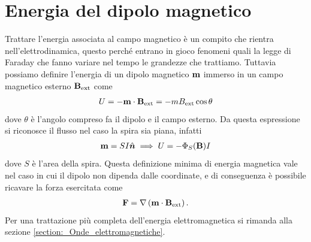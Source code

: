 \section{Energia del dipolo magnetico}
Trattare l'energia associata al campo magnetico è un compito che rientra nell'elettrodinamica, questo perché entrano in gioco fenomeni quali la legge 
di Faraday che fanno variare nel tempo le grandezze che trattiamo. Tuttavia possiamo definire l'energia di un dipolo magnetico $ \mathbf{ m } $ immerso 
in un campo magnetico esterno $ \mathbf{ B }_{\text{ext}} $ come
\begin{align}
  U = - \mathbf{ m } \cdot \mathbf{ B }_{\text{ext}} = - m { B }_{\text{ext}} \cos\theta
\end{align}
dove $ \theta $ è l'angolo compreso fa il dipolo e il campo esterno. Da questa espressione si riconosce il flusso nel caso la spira sia piana, infatti
\begin{align}
  \mathbf{ m } = S I \hat{\boldsymbol{n}} \implies U = - \Phi_S({\mathbf{ B }}) I
\end{align}
dove $ S $ è l'area della spira. Questa definizione minima di energia magnetica vale nel caso in cui il dipolo non 
dipenda dalle coordinate, e di conseguenza è possibile ricavare la forza esercitata come
\begin{align}
  \mathbf{ F } = \nabla\left( \mathbf{ m } \cdot \mathbf{ B }_{\text{ext}} \right).
\end{align}
Per una trattazione più completa dell'energia elettromagnetica si rimanda alla sezione \ref{section:_Onde_elettromagnetiche}.


